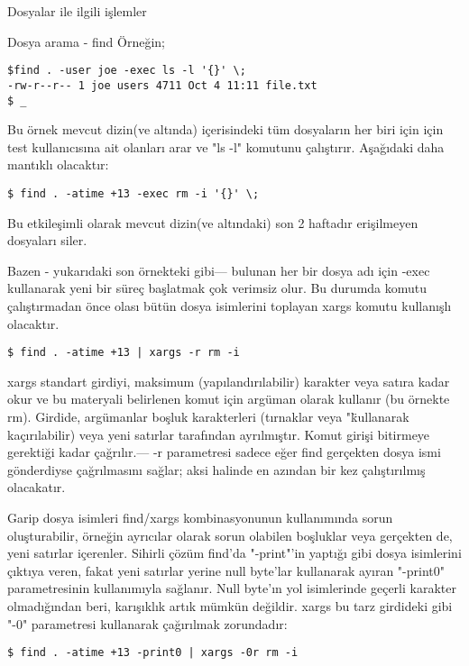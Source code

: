 \begin{section}{Dosyalar ile ilgili işlemler}
\begin{subsection}{Dosya arama - find}
Örneğin;
\begin{verbatim}
$find . -user joe -exec ls -l '{}' \;
-rw-r--r-- 1 joe users 4711 Oct 4 11:11 file.txt
$ _
\end{verbatim}

Bu örnek mevcut dizin(ve altında) içerisindeki tüm dosyaların her biri için için test kullanıcısına ait olanları arar ve "ls -l" komutunu çalıştırır. Aşağıdaki daha mantıklı olacaktır:

\begin{verbatim}
$ find . -atime +13 -exec rm -i '{}' \; 
\end{verbatim}

Bu etkileşimli olarak mevcut dizin(ve altındaki) son 2 haftadır erişilmeyen dosyaları siler.

Bazen - yukarıdaki son örnekteki gibi— bulunan her bir dosya adı için -exec kullanarak yeni bir süreç başlatmak çok verimsiz olur. Bu durumda komutu çalıştırmadan önce olası bütün dosya isimlerini toplayan xargs komutu kullanışlı olacaktır.
\begin{verbatim}
$ find . -atime +13 | xargs -r rm -i
\end{verbatim}
xargs standart girdiyi,  maksimum (yapılandırılabilir) karakter veya satıra kadar okur ve bu materyali belirlenen komut için argüman olarak kullanır (bu örnekte rm). Girdide, argümanlar boşluk karakterleri (tırnaklar veya "\" kullanarak kaçırılabilir) veya yeni satırlar tarafından ayrılmıştır. Komut girişi bitirmeye gerektiği kadar çağrılır.— -r parametresi sadece eğer find gerçekten dosya ismi gönderdiyse çağrılmasını sağlar; aksi halinde en azından bir kez çalıştırılmış olacakatır.

Garip dosya isimleri find/xargs kombinasyonunun kullanımında sorun oluşturabilir, örneğin ayrıcılar olarak sorun olabilen boşluklar veya gerçekten de, yeni satırlar içerenler. Sihirli çözüm find'da "-print"'in yaptığı gibi dosya isimlerini çıktıya veren, fakat yeni satırlar yerine null byte'lar kullanarak ayıran "-print0" parametresinin kullanımıyla sağlanır. Null byte'ın yol isimlerinde geçerli karakter olmadığından beri, karışıklık artık mümkün değildir. xargs bu tarz girdideki gibi "-0" parametresi kullanarak çağırılmak zorundadır:
\begin{verbatim}
$ find . -atime +13 -print0 | xargs -0r rm -i
\end{verbatim}


\end{subsection}
\end{section}
